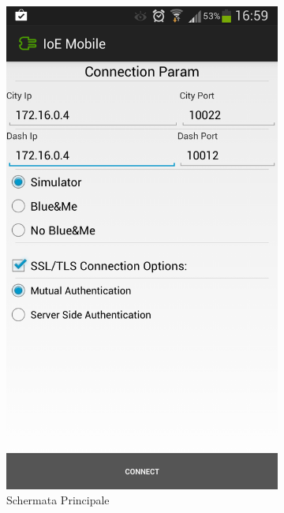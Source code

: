 \begin{figure}
	\centering
	\begin{subfigure}{0.49\textwidth}
		\includegraphics[width=\textwidth]{assets/mobile-app-main.png}
		\caption{Schermata Principale}
		\label{fig:main-activity}
	\end{subfigure}
	\begin{subfigure}{0.49\textwidth}

\end{subfigure}
\end{figure}
